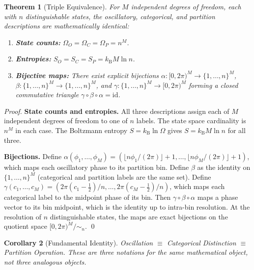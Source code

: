 \documentclass[11pt,twocolumn,a4paper]{article}
\newtheorem{theorem}{Theorem}[section]
\newtheorem{corollary}[theorem]{Corollary}
\newcommand{\kb}{k_{\mathrm{B}}}
\begin{document}
\begin{theorem}[Triple Equivalence]
\label{thm:triple-equivalence}
For $M$ independent degrees of freedom, each with $n$ distinguishable
states, the oscillatory, categorical, and partition descriptions are
mathematically identical:
\begin{enumerate}[leftmargin=*,itemsep=1pt]
\item \textbf{State counts:}
  $\Omega_O = \Omega_C = \Omega_P = n^M$.
\item \textbf{Entropies:}
  $S_O = S_C = S_P = \kb M \ln n$.
\item \textbf{Bijective maps:} There exist explicit bijections
  $\alpha : [0,2\pi)^M \to \{1,\ldots,n\}^M$,
  $\beta : \{1,\ldots,n\}^M \to \{1,\ldots,n\}^M$, and
  $\gamma : \{1,\ldots,n\}^M \to [0,2\pi)^M$ forming a closed
  commutative triangle $\gamma \circ \beta \circ \alpha = \mathrm{id}$.
\end{enumerate}
\end{theorem}

\begin{proof}
\textbf{State counts and entropies.}  All three descriptions assign
each of $M$ independent degrees of freedom to one of $n$ labels.
The state space cardinality is $n^M$ in each case.  The Boltzmann
entropy $S = \kb \ln \Omega$ gives $S = \kb M \ln n$ for all three.

\textbf{Bijections.}  Define
$\alpha(\phi_1, \ldots, \phi_M) = (\lfloor n\phi_1/(2\pi) \rfloor + 1,
\ldots, \lfloor n\phi_M/(2\pi) \rfloor + 1)$, which maps each
oscillatory phase to its partition bin.  Define $\beta$ as the
identity on $\{1,\ldots,n\}^M$ (categorical and partition labels are
the same set).  Define $\gamma(c_1, \ldots, c_M) = (2\pi(c_1 -
\tfrac{1}{2})/n, \ldots, 2\pi(c_M - \tfrac{1}{2})/n)$, which maps
each categorical label to the midpoint phase of its bin.  Then
$\gamma \circ \beta \circ \alpha$ maps a phase vector to its
bin midpoint, which is the identity up to intra-bin resolution.
At the resolution of $n$ distinguishable states, the maps are exact
bijections on the quotient space $[0,2\pi)^M / {\sim_n}$.  \qed
\end{proof}

\begin{corollary}[Fundamental Identity]
\label{cor:fundamental}
Oscillation $\equiv$ Categorical Distinction $\equiv$
Partition Operation.  These are three notations for the same
mathematical object, not three analogous objects.
\end{corollary}
\end{document}
